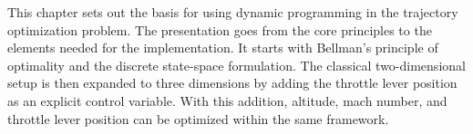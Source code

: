 This chapter sets out the basis for using dynamic programming in the trajectory optimization problem. The presentation goes from the core principles to the elements needed for the implementation. It starts with Bellman’s principle of optimality and the discrete state-space formulation. The classical two-dimensional setup is then expanded to three dimensions by adding the throttle lever position as an explicit control variable. With this addition, altitude, mach number, and throttle lever position can be optimized within the same framework.
